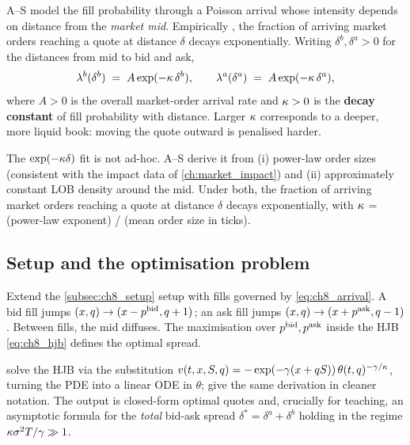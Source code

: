 A--S model the fill probability through a Poisson arrival whose
intensity depends on distance from the \emph{market mid}.
Empirically , the fraction of arriving market orders
reaching a quote at distance $\delta$ decays exponentially. Writing
$\delta^b, \delta^a > 0$ for the distances from mid to bid and ask,
\begin{equation}
  \lambda^b(\delta^b) \;=\; A \exp(-\kappa \, \delta^b),
  \qquad
  \lambda^a(\delta^a) \;=\; A \exp(-\kappa \, \delta^a),
  \label{eq:ch8_arrival}
\end{equation}
where $A > 0$ is the overall market-order arrival rate and
$\kappa > 0$ is the \textbf{decay constant} of fill probability
with distance. Larger $\kappa$ corresponds to a deeper, more liquid
book: moving the quote outward is penalised harder.

\begin{remark}
The $\exp(-\kappa \delta)$ fit is not ad-hoc. A--S derive it from
(i) power-law order sizes (consistent with the impact data of
\cref{ch:market_impact}) and (ii) approximately constant LOB density
around the mid. Under both, the fraction of arriving market orders
reaching a quote at distance $\delta$ decays exponentially, with
$\kappa$ = (power-law exponent) / (mean order size in ticks).
\end{remark}

\subsection{Setup and the optimisation problem}
\label{subsec:ch8_optim_setup}

Extend the \cref{subsec:ch8_setup} setup with fills governed by
\eqref{eq:ch8_arrival}. A bid fill jumps $(x, q) \to
(x - p^{\mathrm{bid}}, q + 1)$; an ask fill jumps $(x, q) \to
(x + p^{\mathrm{ask}}, q - 1)$. Between fills, the mid diffuses. The
maximisation over $p^{\mathrm{bid}}, p^{\mathrm{ask}}$ inside the HJB
\eqref{eq:ch8_hjb} defines the optimal spread.

\citet{avellaneda2008high} solve the HJB via the substitution
$v(t, x, S, q) = -\exp(-\gamma(x + qS))\,
\theta(t, q)^{-\gamma/\kappa}$, turning the PDE into a linear
ODE in $\theta$; \citet{cartea2015algorithmic} give the same
derivation in cleaner notation. The output is closed-form optimal
quotes and, crucially for teaching, an asymptotic formula for
the \emph{total} bid-ask spread $\delta^* = \delta^a + \delta^b$
holding in the regime $\kappa \sigma^2 T / \gamma \gg 1$.

